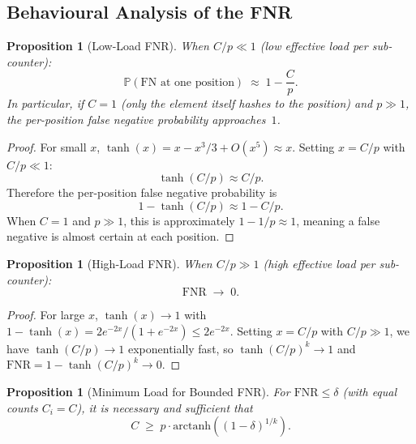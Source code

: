 \documentclass[11pt,a4paper]{article}
\newtheorem{proposition}[theorem]{Proposition}
\newcommand{\FNR}{\mathrm{FNR}}
\newcommand{\Prob}{\mathbb{P}}
\begin{document}
\subsection{Behavioural Analysis of the FNR}\label{ssec:fnr-behaviour}

\begin{proposition}[Low-Load FNR]\label{prop:fnr-lowload}
When $C/p \ll 1$ (low effective load per sub-counter):
\begin{equation}\label{eq:fnr-lowload}
  \Prob(\text{FN at one position}) \;\approx\; 1 - \frac{C}{p}.
\end{equation}
In particular, if $C = 1$ (only the element itself hashes to the position)
and $p \gg 1$, the per-position false negative probability approaches~$1$.
\end{proposition}

\begin{proof}
For small $x$, $\tanh(x) = x - x^3/3 + O(x^5) \approx x$.
Setting $x = C/p$ with $C/p \ll 1$:
\begin{equation}\label{eq:tanh-small}
  \tanh(C/p) \approx C/p.
\end{equation}
Therefore the per-position false negative probability is
\begin{equation}\label{eq:fn-small}
  1 - \tanh(C/p) \approx 1 - C/p.
\end{equation}
When $C = 1$ and $p \gg 1$, this is approximately $1 - 1/p \approx 1$,
meaning a false negative is almost certain at each position.
\end{proof}

\begin{proposition}[High-Load FNR]\label{prop:fnr-highload}
When $C/p \gg 1$ (high effective load per sub-counter):
\begin{equation}\label{eq:fnr-highload}
  \FNR \;\to\; 0.
\end{equation}
\end{proposition}

\begin{proof}
For large $x$, $\tanh(x) \to 1$ with $1 - \tanh(x) = 2e^{-2x}/(1 +
e^{-2x}) \le 2e^{-2x}$.  Setting $x = C/p$ with $C/p \gg 1$, we have
$\tanh(C/p) \to 1$ exponentially fast, so $\tanh(C/p)^k \to 1$ and
$\FNR = 1 - \tanh(C/p)^k \to 0$.
\end{proof}

\begin{proposition}[Minimum Load for Bounded FNR]\label{prop:min-load}
For $\FNR \le \delta$ (with equal counts $C_i = C$), it is necessary and
sufficient that
\begin{equation}\label{eq:min-load}
  C \;\ge\; p \cdot \mathrm{arctanh}\!\left((1 - \delta)^{1/k}\right).
\end{equation}
\end{proposition}
\end{document}
